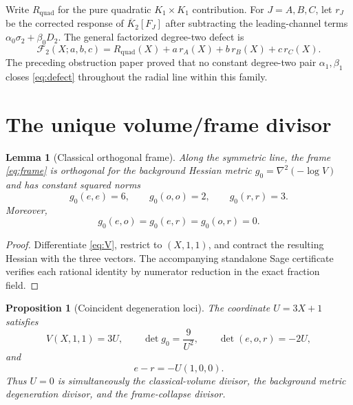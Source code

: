 \documentclass[11pt]{article}
\newtheorem{proposition}[theorem]{Proposition}
\newtheorem{lemma}[theorem]{Lemma}
\theoremstyle{definition}
\theoremstyle{remark}
\newcommand{\bK}{\overline{K}}
\begin{document}
Write $R_{\mathrm{quad}}$ for the pure quadratic $K_1\times K_1$ contribution.  For $J=A,B,C$, let $r_J$ be the corrected response of $\bK_2[F_J]$ after subtracting the leading-channel terms $\alpha_0\sigma_2+\beta_0D_2$.  The general factorized degree-two defect is
\begin{equation}\label{eq:defect}
 \mathscr F_2(X;a,b,c)
 =R_{\mathrm{quad}}(X)+a\,r_A(X)+b\,r_B(X)+c\,r_C(X).
\end{equation}
The preceding obstruction paper proved that no constant degree-two pair $\alpha_1,\beta_1$ closes \eqref{eq:defect} throughout the radial line within this family.

\section{The unique volume/frame divisor}

\begin{lemma}[Classical orthogonal frame]\label{lem:frame}
Along the symmetric line, the frame \eqref{eq:frame} is orthogonal for the background Hessian metric $g_0=\nabla^2(-\log V)$ and has constant squared norms
\begin{equation}\label{eq:g0norms}
 g_0(e,e)=6,
 \qquad
 g_0(o,o)=2,
 \qquad
 g_0(r,r)=3.
\end{equation}
Moreover,
\begin{equation}\label{eq:cross}
 g_0(e,o)=g_0(e,r)=g_0(o,r)=0.
\end{equation}
\end{lemma}

\begin{proof}
Differentiate \eqref{eq:V}, restrict to $(X,1,1)$, and contract the resulting Hessian with the three vectors.  The accompanying standalone Sage certificate verifies each rational identity by numerator reduction in the exact fraction field.
\end{proof}

\begin{proposition}[Coincident degeneration loci]\label{prop:divisor}
The coordinate $U=3X+1$ satisfies
\begin{equation}\label{eq:divisoridentities}
 V(X,1,1)=3U,
 \qquad
 \det g_0=\frac9{U^2},
 \qquad
 \det(e,o,r)=-2U,
\end{equation}
and
\begin{equation}\label{eq:er}
 e-r=-U(1,0,0).
\end{equation}
Thus $U=0$ is simultaneously the classical-volume divisor, the background metric degeneration divisor, and the frame-collapse divisor.
\end{proposition}
\end{document}
